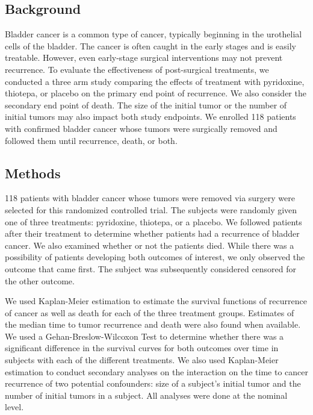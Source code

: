 \documentclass{article}
\begin{document}
	\newpage
	\subsection*{Background} %

	Bladder cancer is a common type of cancer, typically beginning in the urothelial cells of the bladder. The cancer is often caught in the early stages and is easily treatable. However, even early-stage surgical interventions may not prevent recurrence. To evaluate the effectiveness of post-surgical treatments, we conducted a three arm study comparing the effects of treatment with pyridoxine, thiotepa, or placebo on the primary end point of recurrence. We also consider the secondary end point of death. The size of the initial tumor or the number of initial tumors may also impact both study endpoints. We enrolled 118 patients with confirmed bladder cancer whose tumors were surgically removed and followed them until recurrence, death, or both.


	\subsection*{Methods}
	118 patients with bladder cancer whose tumors were removed via surgery were selected for this randomized controlled trial. The subjects were randomly given one of three treatments: pyridoxine, thiotepa, or a placebo. We followed patients after their treatment to determine whether patients had a recurrence of bladder cancer. We also examined whether or not the patients died. While there was a possibility of patients developing both outcomes of interest, we only observed the outcome that came first. The subject was subsequently considered censored for the other outcome.

	We used Kaplan-Meier estimation to estimate the survival functions of recurrence of cancer as well as death for each of the three treatment groups. Estimates of the median time to tumor recurrence and death were also found when available. We used a Gehan-Breslow-Wilcoxon Test to determine whether there was a significant difference in the survival curves for both outcomes over time in subjects with each of the different treatments. We also used Kaplan-Meier estimation to conduct secondary analyses on the interaction on the time to cancer recurrence of two potential confounders: size of a subject’s initial tumor and the number of initial tumors in a subject. All analyses were done at the nominal level.
\end{document}
